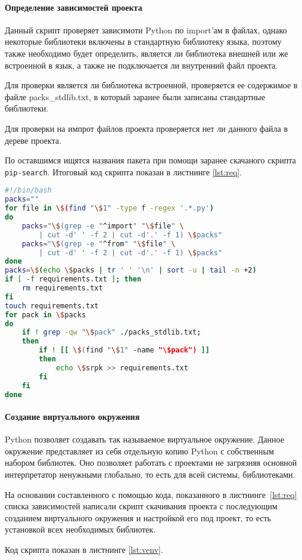 \paragraph{Определение зависимостей проекта}\mbox{}\par
Данный скрипт проверяет зависимоти Python по import’ам в файлах,
однако некоторые библиотеки включены в стандартную библиотеку языка, поэтому
также необходимо будет определить, является ли библиотека внешней или
же встроенной в язык, а также не подключается ли внутренний файл проекта.\par
Для проверки является ли библиотека встроенной,
проверяется ее содержимое в файле packs\_stdlib.txt, в который
заранее были записаны стандартные библиотеки.\par
Для проверки на импрот файлов
проекта проверяется нет ли данного файла в дереве проекта.\par
По оставшимся ищятся названия пакета при помощи заранее скачаного скрипта
\texttt{pip-search}.
Итоговый код скрипта показан в листнинге \ref{lst:req}.

\begin{lstlisting}[language=Bash
	, caption=\leftline{Определение зависимостей проекта}
	, label=lst:req]
#!/bin/bash
packs=""
for file in \$(find "\$1" -type f -regex '.*.py')
do
	packs="\$(grep -e "^import" "\$file" \
		| cut -d' ' -f 2 | cut -d'.' -f 1) \$packs"
	packs="\$(grep -e "^from" "\$file" \
		| cut -d' ' -f 2 | cut -d'.' -f 1) \$packs"
done
packs=\$(echo \$packs | tr ' ' '\n' | sort -u | tail -n +2)
if [ -f requirements.txt ]; then
	rm requirements.txt
fi
touch requirements.txt
for pack in \$packs
do
	if ! grep -qw "\$pack" ./packs_stdlib.txt;
	then
		if ! [[ \$(find "\$1" -name "\$pack") ]]
		then
			echo \$srpk >> requirements.txt
		fi
	fi
done
\end{lstlisting}

\paragraph{Создание виртуального окружения}\mbox{}\par
Python позволяет создавать так называемое виртуальное окружение.
Данное окружение представляет из себя отдельную копию Python с
собственным набором библиотек. Оно позволяет работать с проектами не
загрязняя основной интерпретатор ненужными глобально, то есть для всей
системы, библиотеками.\par
На основании составленного с помощью кода, показанного
в листнинге~\ref{lst:req} списка зависимостей
написали скрипт скачивания проекта с
последующим созданием виртуального окружения и настройкой его под
проект, то есть установкой всех необходимых библиотек.\par
Код скрипта показан в листнинге \ref{lst:venv}.

